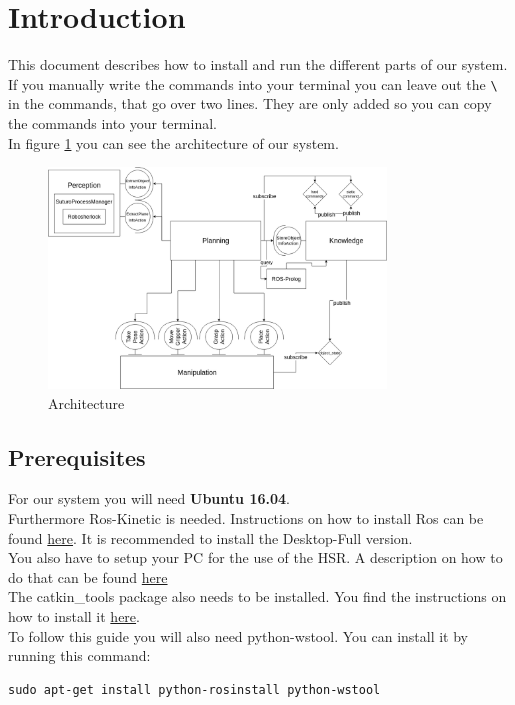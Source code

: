 \documentclass[main.tex]{subfiles}
\begin{document}
\newpage
	\section{Introduction}
	This document describes how to install and run the different parts of our system. If you manually write the commands into your terminal you can leave out the \texttt{\textbackslash} in the commands, that go over two lines. They are only added so you can copy the commands into your terminal.\\
	In figure \ref{fig:architecture} you can see the architecture of our system.
	\begin{figure}[h]
\centering
\includegraphics[width=0.8\textwidth]{architecture/architecture}
\caption{Architecture}
\label{fig:architecture}
\end{figure}
	
	\subsection{Prerequisites}
	
	For our system you will need \textbf{Ubuntu 16.04}.\\
	Furthermore Ros-Kinetic is needed. Instructions on how to install Ros can be found \href{http://wiki.ros.org/kinetic/Installation/Ubuntu}{here}. It is recommended to install the Desktop-Full version.\\
	You also have to setup your PC for the use of the HSR.
	A description on how to do that can be found \href{https://docs.hsr.io/manual_en/howto/pc_install.html}{here}\\
	The catkin\_tools package also needs to be installed. You find the instructions on how to install it \href{https://catkin-tools.readthedocs.io/en/latest/installing.html}{here}.\\
	To follow this guide you will also need python-wstool.
	You can install it by running this command:
	\begin{lstlisting}
sudo apt-get install python-rosinstall python-wstool
\end{lstlisting}
	
\end{document}
